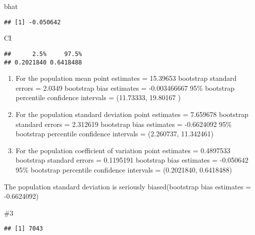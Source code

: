 \documentclass[]{article}
\newenvironment{Shaded}{\begin{snugshade}}{\end{snugshade}}
\newcommand{\KeywordTok}[1]{\textcolor[rgb]{0.13,0.29,0.53}{\textbf{#1}}}
\newcommand{\NormalTok}[1]{#1}
\newcommand{\OperatorTok}[1]{\textcolor[rgb]{0.81,0.36,0.00}{\textbf{#1}}}
\newcommand{\StringTok}[1]{\textcolor[rgb]{0.31,0.60,0.02}{#1}}
\begin{document}
\begin{Shaded}
\begin{Highlighting}[]
\NormalTok{bhat}
\end{Highlighting}
\end{Shaded}

\begin{verbatim}
## [1] -0.050642
\end{verbatim}

\begin{Shaded}
\begin{Highlighting}[]
\NormalTok{CI}
\end{Highlighting}
\end{Shaded}

\begin{verbatim}
##      2.5%     97.5% 
## 0.2021840 0.6418488
\end{verbatim}

\begin{enumerate}
\def\labelenumi{(\alph{enumi})}
\item
  For the population mean point estimates = 15.39653 bootstrap standard
  errors = 2.0349 bootstrap bias estimates = -0.003466667 95\% bootstrap
  percentile confidence intervals = (11.73333, 19.80167 )
\item
  For the population standard deviation point estimates = 7.659678
  bootstrap standard errors = 2.312619 bootstrap bias estimates =
  -0.6624092 95\% bootstrap percentile confidence intervals = (2.260737,
  11.342461)
\item
  For the population coefficient of variation point estimates =
  0.4897533 bootstrap standard errors = 0.1195191 bootstrap bias
  estimates = -0.050642 95\% bootstrap percentile confidence intervals =
  (0.2021840, 0.6418488)
\end{enumerate}

The population standard deviation is seriously biased(bootstrap bias
estimates = -0.6624092)

\#3

\begin{Shaded}
\end{Shaded}

\begin{verbatim}
## [1] 7043
\end{verbatim}
\end{document}

